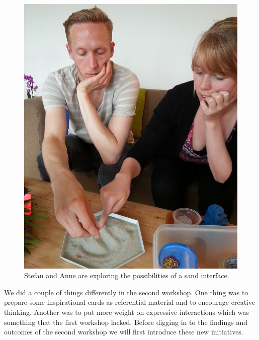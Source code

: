 \begin{figure}[h]
  \centering
  \begin{minipage}[b]{.8\textwidth}
    \centering
    \includegraphics[width=.7\linewidth]{figures/stefan_anne}
  \caption{Stefan and Anne are exploring the possibilities of a sand interface.}
   \label{stefan_anne}
   \end{minipage}
\end{figure}

We did a couple of things differently in the second workshop.
One thing was to prepare some inspirational cards as referential material and to encourage creative thinking.
Another was to put more weight on expressive interactions which was something that the first workshop lacked.
Before digging in to the findings and outcomes of the second workshop we will first introduce these new initiatives.

